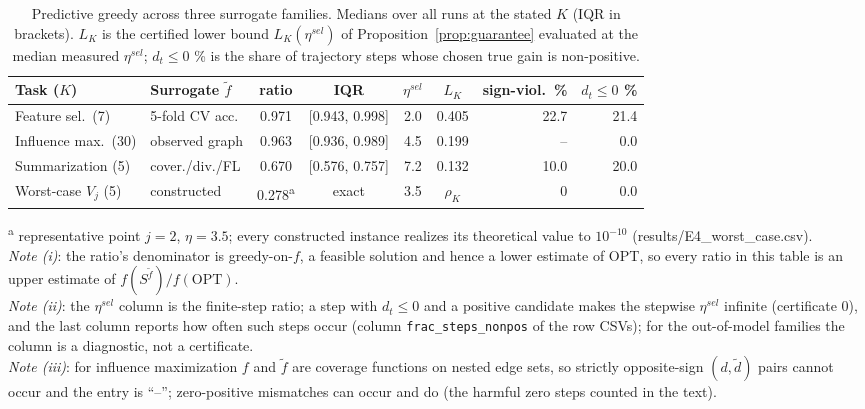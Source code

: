 \begin{table}[t]
\centering
\caption{Predictive greedy across three surrogate families. Medians over all
runs at the stated $K$ (IQR in brackets). $L_K$ is the certified lower bound
$L_K(\eta^{sel})$ of Proposition~\ref{prop:guarantee} evaluated at the median
measured $\eta^{sel}$; $d_t \le 0$ \% is the share of trajectory steps whose
chosen true gain is non-positive.}
\label{tab:experiments}
\small
\setlength{\tabcolsep}{4pt}
\begin{tabular}{llccccrr}
\toprule
Task ($K$) & Surrogate $\tilde f$ & ratio & IQR & $\eta^{sel}$ & $L_K$ & sign-viol.\ \% & $d_t\!\le\!0$ \% \\
\midrule
Feature sel.\ (7) & 5-fold CV acc. & 0.971 & [0.943, 0.998] & 2.0 & 0.405 & 22.7 & 21.4 \\
Influence max.\ (30) & observed graph & 0.963 & [0.936, 0.989] & 4.5 & 0.199 & -- & 0.0 \\
Summarization (5) & cover./div./FL & 0.670 & [0.576, 0.757] & 7.2 & 0.132 & 10.0 & 20.0 \\
\midrule
Worst-case $V_j$ (5) & constructed & 0.278\textsuperscript{a} & exact & 3.5 & $\rho_K$ & 0 & 0.0 \\
\bottomrule
\end{tabular}
\vspace{2pt}
{\footnotesize \textsuperscript{a} representative point $j=2$, $\eta=3.5$;
every constructed instance realizes its theoretical value to $10^{-10}$
(results/E4\_worst\_case.csv).\\
\emph{Note (i)}: the ratio's denominator is greedy-on-$f$, a feasible
solution and hence a lower estimate of OPT, so every ratio in this table is
an upper estimate of $f(S^{\tilde f})/f(\mathrm{OPT})$.\\
\emph{Note (ii)}: the $\eta^{sel}$ column is the finite-step ratio; a step
with $d_t \le 0$ and a positive candidate makes the stepwise $\eta^{sel}$
infinite (certificate $0$), and the last column reports how often such
steps occur (column \texttt{frac\_steps\_nonpos} of the row CSVs); for the
out-of-model families the column is a diagnostic, not a certificate.\\
\emph{Note (iii)}: for influence maximization $f$ and $\tilde f$ are
coverage functions on nested edge sets, so strictly opposite-sign
$(d,\tilde d)$ pairs cannot occur and the entry is ``--''; zero-positive
mismatches can occur and do (the harmful zero steps counted in the text).}
\end{table}
